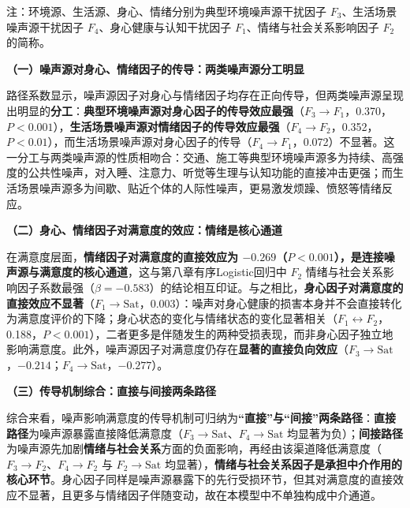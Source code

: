 注：环境源、生活源、身心、情绪分别为典型环境噪声源干扰因子 $F_3$、生活场景噪声源干扰因子 $F_4$、身心健康与认知干扰因子 $F_1$、情绪与社会关系影响因子 $F_2$ 的简称。

\textbf{（一）噪声源对身心、情绪因子的传导：两类噪声源分工明显}

路径系数显示，噪声源因子对身心与情绪因子均存在正向传导，但两类噪声源呈现出明显的\textbf{分工}：\textbf{典型环境噪声源对身心因子的传导效应最强}（$F_3\to F_1$，0.370，$P<0.001$），\textbf{生活场景噪声源对情绪因子的传导效应最强}（$F_4\to F_2$，0.352，$P<0.01$），而生活场景噪声源对身心因子的传导（$F_4\to F_1$，0.072）不显著。这一分工与两类噪声源的性质相吻合：交通、施工等典型环境噪声源多为持续、高强度的公共性噪声，对入睡、注意力、听觉等生理与认知功能的直接冲击更强；而生活场景噪声源多为间歇、贴近个体的人际性噪声，更易激发烦躁、愤怒等情绪反应。

\textbf{（二）身心、情绪因子对满意度的效应：情绪是核心通道}

在满意度层面，\textbf{情绪因子对满意度的直接效应为 $-0.269$（$P<0.001$），是连接噪声源与满意度的核心通道}，这与第八章有序Logistic回归中 $F_2$ 情绪与社会关系影响因子系数最强（$\beta=-0.583$）的结论相互印证。与之相比，\textbf{身心因子对满意度的直接效应不显著}（$F_1\to\mathrm{Sat}$，0.003）：噪声对身心健康的损害本身并不会直接转化为满意度评价的下降；身心状态的变化与情绪状态的变化显著相关（$F_1\leftrightarrow F_2$，0.188，$P<0.001$），二者更多是伴随发生的两种受损表现，而非身心因子独立地影响满意度。此外，噪声源因子对满意度仍存在\textbf{显著的直接负向效应}（$F_3\to\mathrm{Sat}$，$-0.214$；$F_4\to\mathrm{Sat}$，$-0.277$）。

\textbf{（三）传导机制综合：直接与间接两条路径}

综合来看，噪声影响满意度的传导机制可归纳为\textbf{“直接”与“间接”两条路径}：\textbf{直接路径}为噪声源暴露直接降低满意度（$F_3\to\mathrm{Sat}$、$F_4\to\mathrm{Sat}$ 均显著为负）；\textbf{间接路径}为噪声源先加剧\textbf{情绪与社会关系}方面的负面影响，再经由该渠道降低满意度（$F_3\to F_2$、$F_4\to F_2$ 与 $F_2\to\mathrm{Sat}$ 均显著），\textbf{情绪与社会关系因子是承担中介作用的核心环节}。身心因子同样是噪声源暴露下的先行受损环节，但其对满意度的直接效应不显著，且更多与情绪因子伴随变动，故在本模型中不单独构成中介通道。
